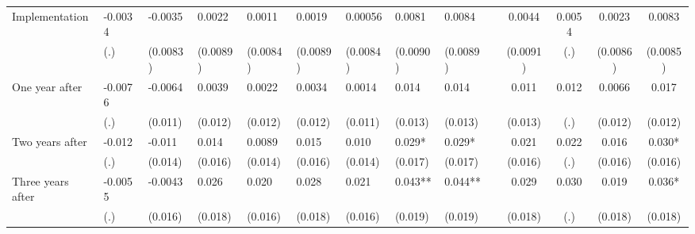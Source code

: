 \begin{tabular}{lccccrrrrrcccc}
Implementation & \multicolumn{1}{l}{-0.0034} & \multicolumn{1}{l}{-0.0035} & \multicolumn{1}{l}{0.0022} & \multicolumn{1}{l}{0.0011} & \multicolumn{1}{l}{0.0019} & \multicolumn{1}{l}{0.00056} & \multicolumn{1}{l}{0.0081} & \multicolumn{1}{l}{0.0084} &       & 0.0044 & 0.0054 & 0.0023 & 0.0083 \\
      & \multicolumn{1}{l}{(.)} & \multicolumn{1}{l}{(0.0083)} & \multicolumn{1}{l}{(0.0089)} & \multicolumn{1}{l}{(0.0084)} & \multicolumn{1}{l}{(0.0089)} & \multicolumn{1}{l}{(0.0084)} & \multicolumn{1}{l}{(0.0090)} & \multicolumn{1}{l}{(0.0089)} &       & (0.0091) & (.)   & (0.0086) & (0.0085) \\
One year after & \multicolumn{1}{l}{-0.0076} & \multicolumn{1}{l}{-0.0064} & \multicolumn{1}{l}{0.0039} & \multicolumn{1}{l}{0.0022} & \multicolumn{1}{l}{0.0034} & \multicolumn{1}{l}{0.0014} & \multicolumn{1}{l}{0.014} & \multicolumn{1}{l}{0.014} &       & 0.011 & 0.012 & 0.0066 & 0.017 \\
      & \multicolumn{1}{l}{(.)} & \multicolumn{1}{l}{(0.011)} & \multicolumn{1}{l}{(0.012)} & \multicolumn{1}{l}{(0.012)} & \multicolumn{1}{l}{(0.012)} & \multicolumn{1}{l}{(0.011)} & \multicolumn{1}{l}{(0.013)} & \multicolumn{1}{l}{(0.013)} &       & (0.013) & (.)   & (0.012) & (0.012) \\
Two years after & \multicolumn{1}{l}{-0.012} & \multicolumn{1}{l}{-0.011} & \multicolumn{1}{l}{0.014} & \multicolumn{1}{l}{0.0089} & \multicolumn{1}{l}{0.015} & \multicolumn{1}{l}{0.010} & \multicolumn{1}{l}{0.029*} & \multicolumn{1}{l}{0.029*} &       & 0.021 & 0.022 & 0.016 & 0.030* \\
      & \multicolumn{1}{l}{(.)} & \multicolumn{1}{l}{(0.014)} & \multicolumn{1}{l}{(0.016)} & \multicolumn{1}{l}{(0.014)} & \multicolumn{1}{l}{(0.016)} & \multicolumn{1}{l}{(0.014)} & \multicolumn{1}{l}{(0.017)} & \multicolumn{1}{l}{(0.017)} &       & (0.016) & (.)   & (0.016) & (0.016) \\
Three years after & \multicolumn{1}{l}{-0.0055} & \multicolumn{1}{l}{-0.0043} & \multicolumn{1}{l}{0.026} & \multicolumn{1}{l}{0.020} & \multicolumn{1}{l}{0.028} & \multicolumn{1}{l}{0.021} & \multicolumn{1}{l}{0.043**} & \multicolumn{1}{l}{0.044**} &       & 0.029 & 0.030 & 0.019 & 0.036* \\
      & \multicolumn{1}{l}{(.)} & \multicolumn{1}{l}{(0.016)} & \multicolumn{1}{l}{(0.018)} & \multicolumn{1}{l}{(0.016)} & \multicolumn{1}{l}{(0.018)} & \multicolumn{1}{l}{(0.016)} & \multicolumn{1}{l}{(0.019)} & \multicolumn{1}{l}{(0.019)} &       & (0.018) & (.)   & (0.018) & (0.018) \\

\end{tabular}
